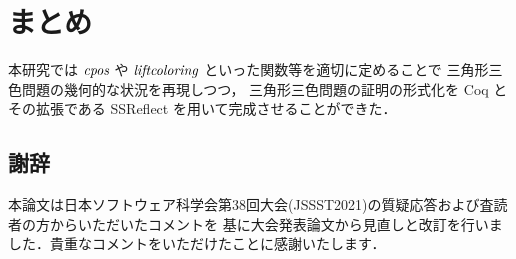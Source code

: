 \section{まとめ}
本研究では $\textit{cpos}$ や $\textit{liftcoloring}$ といった関数等を適切に定めることで
三角形三色問題の幾何的な状況を再現しつつ，
三角形三色問題の証明の形式化を Coq とその拡張である SSReflect を用いて完成させることができた．

\subsection*{謝辞}
本論文は日本ソフトウェア科学会第38回大会(JSSST2021)の質疑応答および査読者の方からいただいたコメントを
基に大会発表論文から見直しと改訂を行いました．貴重なコメントをいただけたことに感謝いたします．
